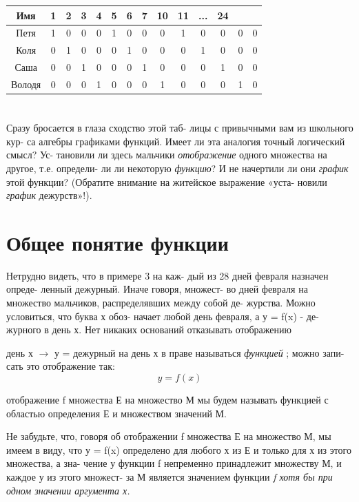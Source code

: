 \newpage

\begin{multicols}{2}
\setcounter{page}{5}
\begin{tabular}{|*{14}{c|}}
\hline
   Имя  & 1 & 2 & 3 & 4 & 5 & 6 & 7 & 10 & 11 & ... & 24\\
  \hline
  Петя & 1 & 0 & 0 & 0 & 1 & 0 & 0 & 0 & 1 & 0 & 0 & 0 & 0\\
  \hline
  Коля & 0 & 1 & 0 & 0 & 0 & 1 & 0 & 0 & 0 & 1 & 0 & 0 & 0\\
  \hline
  Саша & 0 & 0 & 1 & 0 & 0 & 0 & 1 & 0 & 0 & 0 & 1 & 0 & 0\\
  \hline
  Володя & 0 & 0 & 0 & 1 & 0 & 0 & 0 & 1 & 0 & 0 & 0 & 1 & 0\\ 
 \hline
\end{tabular}
\section*{}
Сразу бросается в глаза сходство этой таб-
лицы с привычными вам из школьного кур-
са алгебры графиками функций. Имеет ли
эта аналогия точный логический смысл? Ус-
тановили ли здесь мальчики { \em отображение}
одного множества на другое, т.е. определи-
ли ли некоторую { \em функцию}? И не начертили
ли они {\em график} этой функции? (Обратите
внимание на житейское выражение «уста-
новили { \em график} дежурств»!).
\section*{Общее понятие функции} 
Нетрудно видеть, что в примере 3 на каж-
дый из 28 дней февраля назначен опреде-
ленный дежурный. Иначе говоря, множест-
во дней февраля {} на множество
мальчиков, распределявших между собой де-
журства. Можно условиться, что буква х обоз-
начает любой день февраля, а у = f(x) - де-
журного в день х. Нет никаких оснований
отказывать отображению

день х $\rightarrow$ у = дежурный на день х
в праве называться {\em функцией} ; можно запи-
сать это отображение так:
$$y = f(x)$$

{  отображение f множества Е на
множество М мы будем называть функцией
с областью определения Е и множеством
значений М.}

Не забудьте, что, говоря об отображении f
множества Е на множество М, мы имеем в
виду, что у = f(x) определено для любого х
из Е и только для х из этого множества, а зна-
чение у функции f непременно принадлежит
множеству М, и каждое у из этого множест-
за М является значением функции {\em f хотя
бы при одном значении аргумента х.}


\end{multicols}
